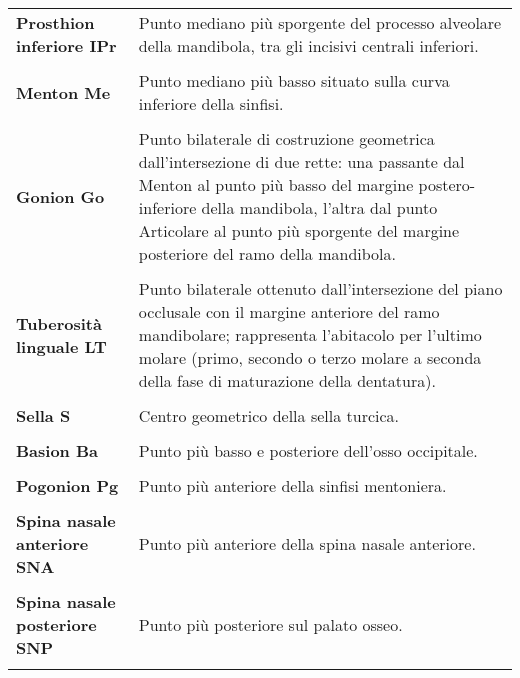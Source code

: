 \begin{longtable}{>{\bfseries}p{5cm}X}
Prosthion inferiore \newline IPr & Punto mediano più sporgente del processo alveolare della mandibola, tra gli incisivi centrali inferiori.\\\\
Menton \newline Me & Punto mediano più basso situato sulla curva inferiore della sinfisi.\\\\
Gonion \newline Go & Punto bilaterale di costruzione geometrica dall'intersezione di due rette: una passante dal Menton al punto più basso del margine postero-inferiore della mandibola, l'altra dal punto Articolare al punto più sporgente del margine posteriore del ramo della mandibola.\\\\
Tuberosità linguale \newline LT & Punto bilaterale ottenuto dall'intersezione del piano occlusale con il margine anteriore del ramo mandibolare; rappresenta l'abitacolo per l'ultimo molare (primo, secondo o terzo molare a seconda della fase di maturazione della dentatura).\\\\
Sella \newline S & Centro geometrico della sella turcica.\\\\
Basion \newline Ba & Punto più basso e posteriore dell'osso occipitale.\\\\
Pogonion \newline Pg & Punto più anteriore della sinfisi mentoniera.\\\\
Spina nasale anteriore \newline SNA & Punto più anteriore della spina nasale anteriore.\\\\
Spina nasale posteriore \newline SNP & Punto più posteriore sul palato osseo.\\\\

\end{longtable}